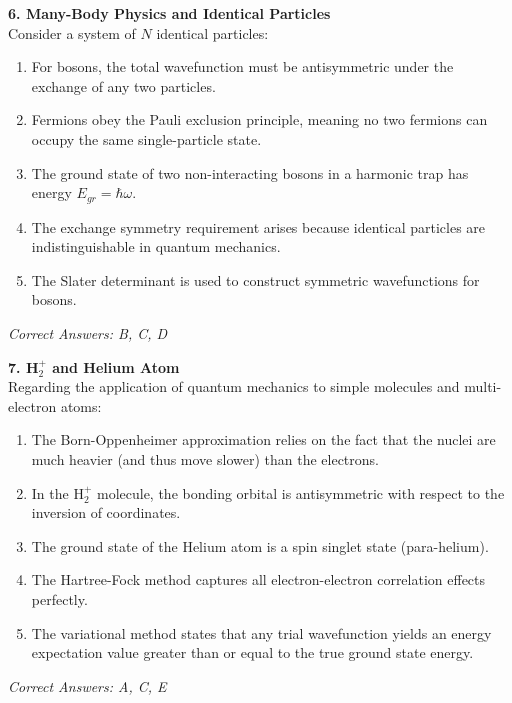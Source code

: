 \documentclass[a4paper,11pt]{article}
\begin{document}
\vspace{0.5cm}

\noindent\textbf{6. Many-Body Physics and Identical Particles}\\
Consider a system of $N$ identical particles:

\begin{enumerate}[label=\Alph*.]
    \item For bosons, the total wavefunction must be antisymmetric under the exchange of any two particles.
    \item Fermions obey the Pauli exclusion principle, meaning no two fermions can occupy the same single-particle state.
    \item The ground state of two non-interacting bosons in a harmonic trap has energy $E_{gr} = \hbar\omega$.
    \item The exchange symmetry requirement arises because identical particles are indistinguishable in quantum mechanics.
    \item The Slater determinant is used to construct symmetric wavefunctions for bosons.
\end{enumerate}
\textit{Correct Answers: B, C, D}

\vspace{0.5cm}

\noindent\textbf{7. H$_2^+$ and Helium Atom}\\
Regarding the application of quantum mechanics to simple molecules and multi-electron atoms:

\begin{enumerate}[label=\Alph*.]
    \item The Born-Oppenheimer approximation relies on the fact that the nuclei are much heavier (and thus move slower) than the electrons.
    \item In the H$_2^+$ molecule, the bonding orbital is antisymmetric with respect to the inversion of coordinates.
    \item The ground state of the Helium atom is a spin singlet state (para-helium).
    \item The Hartree-Fock method captures all electron-electron correlation effects perfectly.
    \item The variational method states that any trial wavefunction yields an energy expectation value greater than or equal to the true ground state energy.
\end{enumerate}
\textit{Correct Answers: A, C, E}
\end{document}
